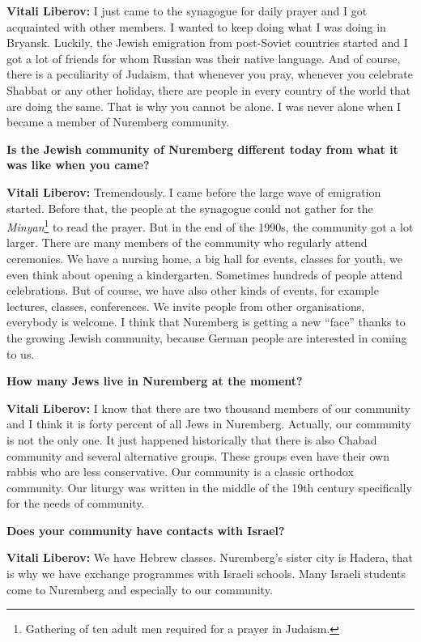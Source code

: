 \textbf{Vitali Liberov:} I just came to the synagogue for daily prayer and I got acquainted with other members. I wanted to keep doing what I was doing in Bryansk. Luckily, the Jewish emigration from post-Soviet countries started and I got a lot of friends for whom Russian was their native language. And of course, there is a peculiarity of Judaism, that whenever you pray, whenever you celebrate Shabbat or any other holiday, there are people in every country of the world that are doing the same. That is why you cannot be alone. I was never alone when I became a member of Nuremberg community.  

\textbf{Is the Jewish community of Nuremberg different today from what it was like when you came?} 

\textbf{Vitali Liberov:} Tremendously. I came before the large wave of emigration started. Before that, the people at the synagogue could not gather for the \textit{Minyan}\footnote{Gathering of ten adult men required for a prayer in Judaism.} to read the prayer. But in the end of the 1990s, the community got a lot larger. There are many members of the community who regularly attend ceremonies. We have a nursing home, a big hall for events, classes for youth, we even think about opening a kindergarten. Sometimes hundreds of people attend celebrations.  But of course, we have also other kinds of events, for example lectures, classes, conferences. We invite people from other organisations, everybody is welcome. I think that Nuremberg is getting a new ``face'' thanks to the growing Jewish community, because German people are interested in coming to us.    

\textbf{How many Jews live in Nuremberg at the moment?} 

\textbf{Vitali Liberov:} I know that there are two thousand members of our community and I think it is forty percent of all Jews in Nuremberg. Actually, our community is not the only one. It just happened historically that there is also Chabad community and several alternative groups. These groups even have their own rabbis who are less conservative. Our community is a classic orthodox community. 
Our liturgy was written in the middle of the 19th century specifically for the needs of community.   

\textbf{Does your community have contacts with Israel?} 

\textbf{Vitali Liberov:} We have Hebrew classes. Nuremberg’s sister city is Hadera, that is why we have exchange programmes with Israeli schools. Many Israeli students come to Nuremberg and especially to our community. 

